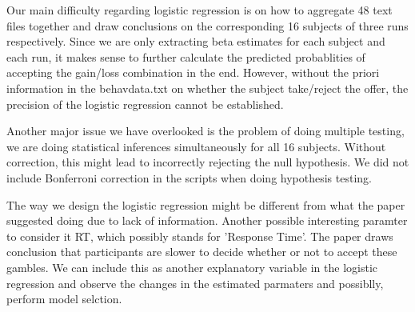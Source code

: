\par \indent Our main difficulty regarding logistic regression is on how to 
aggregate 48 text files together and draw conclusions on the corresponding 16 
subjects of three runs respectively. Since we are only extracting beta 
estimates for each subject and each run, it makes sense to further calculate
the predicted probablities of accepting the gain/loss combination in the end.
However, without the priori information in the behavdata.txt on whether the
subject take/reject the offer, the precision of the logistic regression 
cannot be established. 

\par \indent Another major issue we have overlooked is the problem of doing 
multiple testing, we are doing statistical inferences simultaneously for all 
16 subjects. Without correction, this might lead to incorrectly rejecting
the null hypothesis. We did not include Bonferroni correction in the scripts
when doing hypothesis testing. 

\par \indent The way we design the logistic regression might be different 
from what the paper suggested doing due to lack of information. Another 
possible interesting paramter to consider it RT, which possibly stands for
'Response Time'. The paper draws conclusion that participants are slower
to decide whether or not to accept these gambles. We can include this as
another explanatory variable in the logistic regression and observe the 
changes in the estimated parmaters and possiblly, perform model selction.